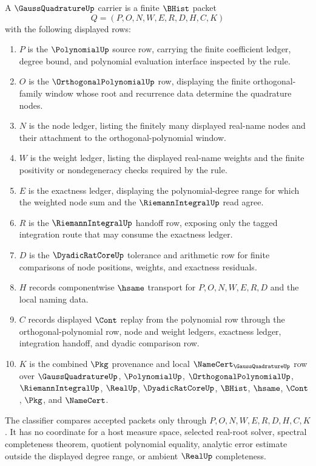 \begin{definition}
\label{def:gauss-quadrature-carrier}
A $\GaussQuadratureUp$ carrier is a finite $\BHist$ packet
$$
Q=(P,O,N,W,E,R,D,H,C,K)
$$
with the following displayed rows:
\begin{enumerate}
\item $P$ is the $\PolynomialUp$ source row, carrying the finite coefficient ledger, degree bound, and polynomial evaluation interface inspected by the rule.
\item $O$ is the $\OrthogonalPolynomialUp$ row, displaying the finite orthogonal-family window whose root and recurrence data determine the quadrature nodes.
\item $N$ is the node ledger, listing the finitely many displayed real-name nodes and their attachment to the orthogonal-polynomial window.
\item $W$ is the weight ledger, listing the displayed real-name weights and the finite positivity or nondegeneracy checks required by the rule.
\item $E$ is the exactness ledger, displaying the polynomial-degree range for which the weighted node sum and the $\RiemannIntegralUp$ read agree.
\item $R$ is the $\RiemannIntegralUp$ handoff row, exposing only the tagged integration route that may consume the exactness ledger.
\item $D$ is the $\DyadicRatCoreUp$ tolerance and arithmetic row for finite comparisons of node positions, weights, and exactness residuals.
\item $H$ records componentwise $\hsame$ transport for $P,O,N,W,E,R,D$ and the local naming data.
\item $C$ records displayed $\Cont$ replay from the polynomial row through the orthogonal-polynomial row, node and weight ledgers, exactness ledger, integration handoff, and dyadic comparison row.
\item $K$ is the combined $\Pkg$ provenance and local $\NameCert_{\GaussQuadratureUp}$ row over $\GaussQuadratureUp$, $\PolynomialUp$, $\OrthogonalPolynomialUp$, $\RiemannIntegralUp$, $\RealUp$, $\DyadicRatCoreUp$, $\BHist$, $\hsame$, $\Cont$, $\Pkg$, and $\NameCert$.
\end{enumerate}
The classifier compares accepted packets only through $P,O,N,W,E,R,D,H,C,K$. It has no coordinate for a host measure space, selected real-root solver, spectral completeness theorem, quotient polynomial equality, analytic error estimate outside the displayed degree range, or ambient $\RealUp$ completeness.
\end{definition}

